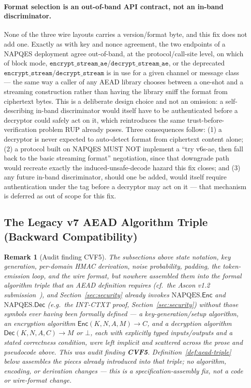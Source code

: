 \documentclass[11pt,a4paper]{article}
\newtheorem{remark}[theorem]{Remark}
\begin{document}
\paragraph{Format selection is an out-of-band API contract, not an in-band
discriminator.} None of the three wire layouts carries a version/format
byte, and this fix does not add one. Exactly as with key and nonce
agreement, the two endpoints of a NAPQES deployment agree out-of-band, at
the protocol/call-site level, on which of block mode,
$\texttt{encrypt\_stream\_ae}$/$\texttt{decrypt\_stream\_ae}$, or the
deprecated $\texttt{encrypt\_stream}$/$\texttt{decrypt\_stream}$ is in use
for a given channel or message class — the same way a caller of any AEAD
library chooses between a one-shot and a streaming construction rather than
having the library sniff the format from ciphertext bytes. This is a
deliberate design choice and not an omission: a self-describing in-band
discriminator would itself have to be authenticated before a decryptor
could safely act on it, which reintroduces the same
trust-before-verification problem RUP already poses. Three consequences
follow: (1) a decryptor is never expected to auto-detect format from
ciphertext content alone; (2) a protocol built on NAPQES MUST NOT implement
a ``try v6s-ae, then fall back to the basic streaming format'' negotiation,
since that downgrade path would recreate exactly the induced-unsafe-decode
hazard this fix closes; and (3) any future in-band discriminator, should
one be added, would itself require authentication under the tag before a
decryptor may act on it — that mechanism is deferred as out of scope for
this fix.

\subsection{The Legacy v7 AEAD Algorithm Triple (Backward Compatibility)}
\label{sec:algorithm-triple}

\begin{remark}[Audit finding CVF5]
The subsections above state notation, key generation, per-domain HMAC
derivation, noise probability, padding, the token-emission loop, and the
wire format, but nowhere assembled them into the formal algorithm triple
that an AEAD definition requires (cf.\ the Ascon v1.2
submission~\cite{ascon2021}), and
Section~\ref{sec:security} already invokes $\mathrm{NAPQES}.\mathsf{Enc}$
and $\mathrm{NAPQES}.\mathsf{Dec}$ (e.g.\ the INT-CTXT proof,
Section~\ref{sec:security}) without those symbols ever having been formally
defined — a key-generation/setup algorithm, an encryption algorithm
$\mathsf{Enc}(K,N,A,M)\to C$, and a decryption algorithm
$\mathsf{Dec}(K,N,A,C)\to M$ or $\bot$, each with explicitly typed
inputs/outputs and a stated correctness condition, were left implicit and
scattered across the prose and pseudocode above. This was audit finding
\textbf{CVF5}. Definition~\ref{def:aead-triple} below assembles the pieces
already introduced into that triple; no algorithm, encoding, or derivation
changes — this is a specification-assembly fix, not a code or wire-format
change.
\end{remark}
\end{document}
